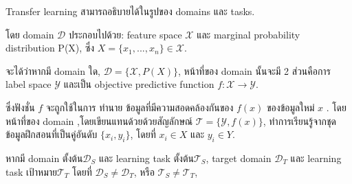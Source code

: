 Transfer learning สามารถอธิบายได้ในรูปของ domains และ tasks.

โดย domain ${\mathcal {D}}$ ประกอบไปด้วย: feature space ${\mathcal {X}}$ และ marginal probability distribution P(X),
ซึ่ง ${\displaystyle X=\{x_{1},...,x_{n}\}\in {\mathcal {X}}}$.

จะได้ว่าหากมี domain ใด, ${\displaystyle {\mathcal {D}}=\{{\mathcal {X}},P(X)\}}$,
หน้าที่ของ domain นั้นจะมี 2 ส่วนคือการ
label space ${\mathcal {Y}}$  และเป็น objective predictive function
${\displaystyle f:{\mathcal {X}}\rightarrow {\mathcal {Y}}}$.

ซึ่งฟังชั่น ${\displaystyle f}$  จะถูกใช้ในการ ทำนาย ข้อมูลที่มีความสอดคล้องกันของ  ${\displaystyle f(x)}$   ของข้อมูลใหม่  ${\displaystyle x}$ .
โดยหน้าที่ของ domain ,โดยเขียนแทนด้วยด้วยสัญลักษณ์   ${\displaystyle {\mathcal {T}}=\{{\mathcal {Y}},f(x)\}}$,
ทำการเรียนรู้จากชุดข้อมูลฝึกสอนที่เป็นคู่อันดับ ${\displaystyle \{x_{i},y_{i}\}}$, โดยที่ ${\displaystyle x_{i}\in {X}}$ และ ${\displaystyle y_{i}\in {Y}}$.

หากมี domain ตั้งต้น${\displaystyle {\mathcal {D}}_{S}}$ และ learning task ตั้งต้น${\displaystyle {\mathcal {T}}_{S}}$,
target domain  ${\mathcal{D}_{T}}$ และ learning task เป้าหมาย${\mathcal{T}_{T}}$
โดยที่ ${\displaystyle {\mathcal {D}}_{S}\neq {\mathcal {D}}_{T}}$, หรือ ${\displaystyle {\mathcal {T}}_{S}\neq {\mathcal {T}}_{T}}$,

